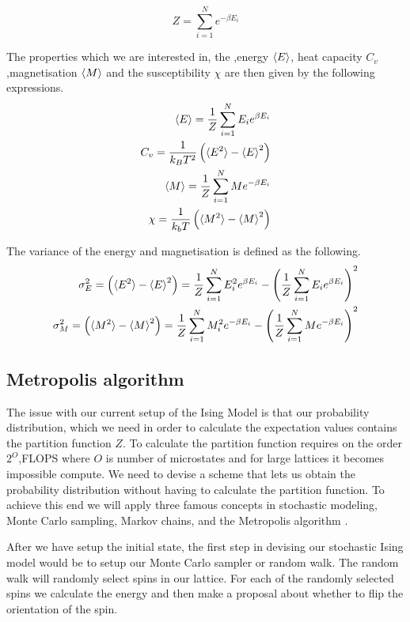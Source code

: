 \begin{equation}\label{eq:partFunc}
  Z = \sum_{i=1}^{N} e^{-\beta E_i}
\end{equation}

The properties which we are interested in, the ,energy $\braket{E}$, heat
capacity $C_v$,magnetisation $\braket{M}$ and the susceptibility $\chi$ are then given
by the following expressions.
\begin{eqnarray}
  \braket{E} = \frac{1}{Z} \sum_{i=1}^N E_i e^{\beta E_i} \\
  C_v = \frac{1}{k_B T^2}\left(\braket{E^2} - \braket{E}^2 \right) \\
  \braket{M} = \frac{1}{Z} \sum_{i=1}^{N} M e^{-\beta E_i} \\
  \chi = \frac{1}{k_b T}\left(\braket{M^2}- \braket{M}^2\right)
\end{eqnarray}

The variance of the energy and magnetisation is defined as the following.
\begin{eqnarray}
  \sigma_E^{2} = \left(\braket{E^2} - \braket{E}^2 \right) = \frac{1}{Z}
  \sum_{i=1}^N E_i^2 e^{\beta E_i} - \left(\frac{1}{Z} \sum_{i=1}^N E_i e^{\beta
  E_i}\right)^2  \\
  \sigma_M^{2} = \left(\braket{M^2}- \braket{M}^2\right) = \frac{1}{Z} \sum_{i=1}^{N} M_i^2 e^{-\beta E_i}  - \left(\frac{1}{Z} \sum_{i=1}^{N} M e^{-\beta E_i}  \right)^2
\end{eqnarray}


\subsection{Metropolis algorithm}
The issue with our current setup of the Ising Model is that our probability
distribution, which we need in order to calculate the expectation values
contains the partition function $Z$. To calculate the partition function
requires on the order $2^{O}$,FLOPS where $O$ is number of microstates and
for large lattices it becomes impossible compute. We need to devise a scheme
that lets us obtain the probability distribution without having to calculate the
partition function. To achieve this end we will apply three famous concepts in
stochastic modeling, Monte Carlo sampling, Markov chains, and the Metropolis
algorithm .

After we have setup the initial state, the first step in devising our
stochastic Ising model would be to setup our Monte Carlo sampler or random walk.
The random walk will randomly select spins in
our lattice. For each of the randomly selected spins we calculate the energy and
then make a proposal about whether to flip the orientation of the spin.

